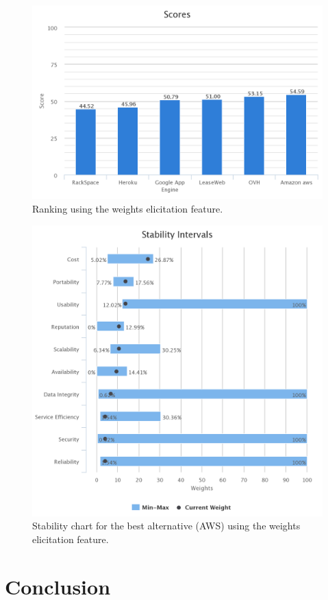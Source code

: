\documentclass[a4paper,11pt]{article}
\begin{document}
\begin{figure}[h]
  \center
  \includegraphics[width=\textwidth-5cm]{img/Result/alternative_ranking.png}
  \caption{Ranking using the weights elicitation feature.}
  \label{fig:alt-ranking}
\end{figure}

\begin{figure}
  \centering
  \includegraphics[width=\textwidth-4cm]{img/Result/alternative_stability.png}
  \caption{Stability chart for the best alternative (AWS) using the weights elicitation feature.}
  \label{fig:alt-stab}
\end{figure}


\section{Conclusion}
\end{document}
